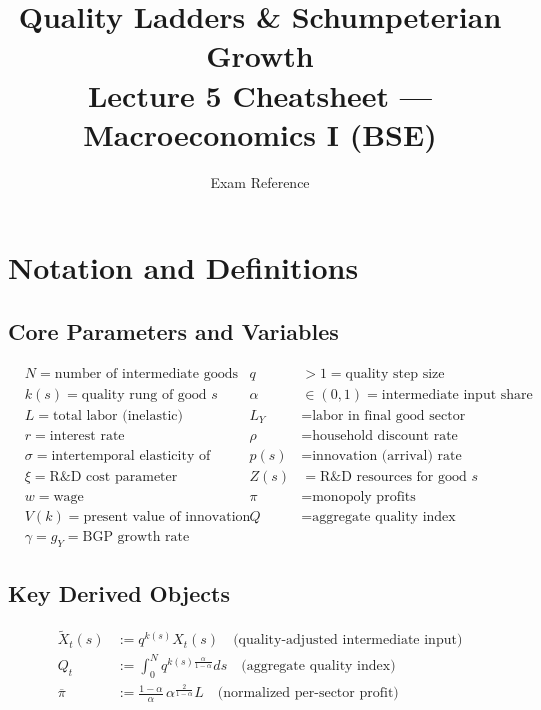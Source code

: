 \documentclass[a4paper,11pt]{article}
\title{\textbf{Quality Ladders \& Schumpeterian Growth}\\[0.3em]
       \large Lecture 5 Cheatsheet --- Macroeconomics I (BSE)}
\author{Exam Reference}
\date{}
\newcommand{\pibar}{\overline{\pi}}
\newcommand{\Xtilde}{\tilde{X}}
\begin{document}
\maketitle
\tableofcontents
\clearpage
\pagestyle{plain}

\section{Notation and Definitions}

\subsection*{Core Parameters and Variables}
\begin{align*}
& N = \text{number of intermediate goods (fixed)} & q &> 1 = \text{quality step size}\\
& k(s) = \text{quality rung of good } s & \alpha &\in (0,1) = \text{intermediate input share}\\
& L = \text{total labor (inelastic)} & L_Y &= \text{labor in final good sector}\\
& r = \text{interest rate} & \rho &= \text{household discount rate}\\
& \sigma = \text{intertemporal elasticity of substitution} & p(s) &= \text{innovation (arrival) rate}\\
& \xi = \text{R\&D cost parameter} & Z(s) &= \text{R\&D resources for good }s\\
& w = \text{wage} & \pi &= \text{monopoly profits}\\
& V(k) = \text{present value of innovation} & Q &= \text{aggregate quality index}\\
& \gamma = g_Y = \text{BGP growth rate}
\end{align*}

\subsection*{Key Derived Objects}
\begin{align*}
\Xtilde_t(s) &:= q^{k(s)} X_t(s) \quad \text{(quality-adjusted intermediate input)}\\
Q_t &:= \int_0^N q^{k(s)\frac{\alpha}{1-\alpha}} ds \quad \text{(aggregate quality index)}\\
\pibar &:= \frac{1-\alpha}{\alpha}\,\alpha^{\frac{2}{1-\alpha}} L \quad \text{(normalized per-sector profit)}
\end{align*}
\end{document}
